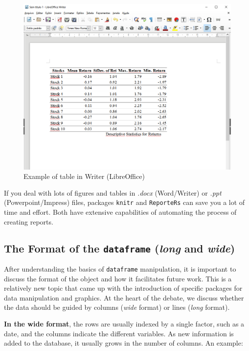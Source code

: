 \documentclass[11pt,]{book}
\begin{document}
\begin{figure}[!htbp]

{\centering \includegraphics[width=0.75\linewidth]{figs/Writer-TableExample} 

}

\caption{Example of table in Writer (LibreOffice)}\label{fig:Writer-TableExample}
\end{figure}

If you deal with lots of figures and tables in \emph{.docx}
(Word/Writer) or \emph{.ppt} (Powerpoint/Impress) files, packages
\texttt{knitr} \citep{knitr} and \texttt{ReporteRs} \citep{reporters}
can save you a lot of time and effort. Both have extensive capabilities
of automating the process of creating reports. 

\subsection{\texorpdfstring{The Format of the \texttt{dataframe}
(\emph{long} and
\emph{wide})}{The Format of the dataframe (long and wide)}}\label{the-format-of-the-dataframe-long-and-wide}

After understanding the basics of \texttt{dataframe} manipulation, it is
important to discuss the format of the object and how it facilitates
future work. This is a relatively new topic that came up with the
introduction of specific packages for data manipulation and graphics. At
the heart of the debate, we discuss whether the data should be guided by
columns (\emph{wide} format) or lines (\emph{long} format).
 

\textbf{In the wide format}, the rows are usually indexed by a single
factor, such as a date, and the columns indicate the different
variables. As new information is added to the database, it usually grows
in the number of columns. An example:
\end{document}
